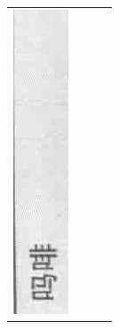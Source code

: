 \documentclass[10pt]{article}
\begin{document}
\begin{center}
\begin{tabular}{|c|c|c|c|}
\includegraphics[max width=\textwidth]{2024_07_05_645bb794a4d4f32ee0c8g-332(3)}

\end{tabular}
\end{center}
\end{document}
